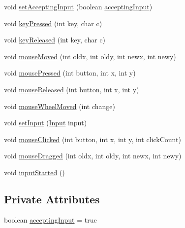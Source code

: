\begin{DoxyCompactItemize}
\item 
void \mbox{\hyperlink{classorg_1_1newdawn_1_1slick_1_1util_1_1_input_adapter_a482763d527972a4ff65ed6a30c1057b6}{set\+Accepting\+Input}} (boolean \mbox{\hyperlink{classorg_1_1newdawn_1_1slick_1_1util_1_1_input_adapter_a29236557cf2412c8f843886d2453c650}{accepting\+Input}})
\item 
void \mbox{\hyperlink{classorg_1_1newdawn_1_1slick_1_1util_1_1_input_adapter_a3178218deea8aa330edf5e5c3699addc}{key\+Pressed}} (int key, char c)
\item 
void \mbox{\hyperlink{classorg_1_1newdawn_1_1slick_1_1util_1_1_input_adapter_a2b610479cd3d4c0eb61cb4ed83c95764}{key\+Released}} (int key, char c)
\item 
void \mbox{\hyperlink{classorg_1_1newdawn_1_1slick_1_1util_1_1_input_adapter_a4ad2eb7dcdd0834b5606e124e41fc9ac}{mouse\+Moved}} (int oldx, int oldy, int newx, int newy)
\item 
void \mbox{\hyperlink{classorg_1_1newdawn_1_1slick_1_1util_1_1_input_adapter_a8c466a6d0e2479d535aa5f435fcc684d}{mouse\+Pressed}} (int button, int x, int y)
\item 
void \mbox{\hyperlink{classorg_1_1newdawn_1_1slick_1_1util_1_1_input_adapter_a29e726b1c4d1734882fc38b4c9ecacdb}{mouse\+Released}} (int button, int x, int y)
\item 
void \mbox{\hyperlink{classorg_1_1newdawn_1_1slick_1_1util_1_1_input_adapter_aecf65d222bf9de39735ce38ae2f97ad3}{mouse\+Wheel\+Moved}} (int change)
\item 
void \mbox{\hyperlink{classorg_1_1newdawn_1_1slick_1_1util_1_1_input_adapter_ab5a715a6c56f677a08be343868877ae3}{set\+Input}} (\mbox{\hyperlink{classorg_1_1newdawn_1_1slick_1_1_input}{Input}} input)
\item 
void \mbox{\hyperlink{classorg_1_1newdawn_1_1slick_1_1util_1_1_input_adapter_acc4caea33acf2a96521865286d414651}{mouse\+Clicked}} (int button, int x, int y, int click\+Count)
\item 
void \mbox{\hyperlink{classorg_1_1newdawn_1_1slick_1_1util_1_1_input_adapter_a185b6e79c736d75fb3dd7319ff1d147a}{mouse\+Dragged}} (int oldx, int oldy, int newx, int newy)
\item 
void \mbox{\hyperlink{classorg_1_1newdawn_1_1slick_1_1util_1_1_input_adapter_aabb9bfda05a319feefe6598b6153e2df}{input\+Started}} ()
\end{DoxyCompactItemize}
\subsection*{Private Attributes}
\begin{DoxyCompactItemize}
\item 
boolean \mbox{\hyperlink{classorg_1_1newdawn_1_1slick_1_1util_1_1_input_adapter_a29236557cf2412c8f843886d2453c650}{accepting\+Input}} = true
\end{DoxyCompactItemize}


